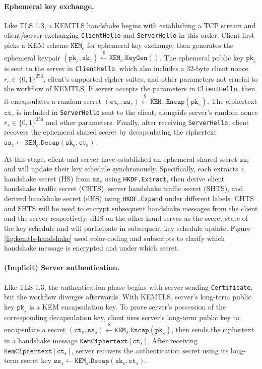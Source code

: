 \documentclass[letterpaper,12pt,titlepage,oneside,final]{book}
\newcommand{\kem}{\texttt{KEM}}
\newcommand{\pk}{\texttt{pk}}
\newcommand{\sk}{\texttt{sk}}
\newcommand{\leftsample}{\stackrel{\$}{\leftarrow}}
\begin{document}
\paragraph{Ephemeral key exchange.} Like TLS 1.3, a KEMTLS handshake begins with establishing a TCP stream and client/server exchanging \texttt{ClientHello} and \texttt{ServerHello} in this order. Client first picks a KEM scheme $\kem_e$ for ephemeral key exchange, then generates the ephemeral keypair $(\pk_e, \sk_e)\leftsample\kem_e\texttt{.KeyGen}()$.
The ephemeral public key $\pk_e$ is sent to the server in \texttt{ClientHello}, which also includes a 32-byte client nonce $r_c\in\{0,1\}^{256}$, client's supported cipher suites, and other parameters not crucial to the workflow of KEMTLS.
If server accepts the parameters in \texttt{ClientHello}, then it encapsulates a random secret $(\texttt{ct}_e, \texttt{ss}_e)\leftsample\kem_e\texttt{.Encap}(\pk_e)$.
The ciphertext $\texttt{ct}_e$ is included in \texttt{ServerHello} sent to the client, alongside server's random nonce $r_s\in\{0,1\}^{256}$ and other parameters.
Finally, after receiving \texttt{ServerHello}, client recovers the ephemeral shared secret by decapsulating the ciphertext $\texttt{ss}_e\leftarrow\kem_e\texttt{.Decap}(\sk_e, \texttt{ct}_e)$.

At this stage, client and server have established an ephemeral shared secret $\texttt{ss}_e$ and will update their key schedule synchronously.
Specifically, each extracts a handshake secret (HS) from $\texttt{ss}_e$ using \texttt{HKDF.Extract}, then derive client handshake traffic secret ({\color{blue}CHTS}), server handshake traffic secret ({\color{blue}SHTS}), and derived handshake secret (dHS) using \texttt{HKDF.Expand} under different labels.
CHTS and SHTS will be used to encrypt subsequent handshake messages from the client and the server respectively.
dHS on the other hand serves as  the secret state of the key schedule and will participate in subsequent key schedule update.
Figure \ref{fig:kemtls-handshake} used color-coding and subscripts to clarify which handshake message is encrypted and under which secret.

\paragraph{(Implicit) Server authentication.} Like TLS 1.3, the authentication phase begins with server sending \texttt{Certificate}, but the workflow diverges afterwards.
With KEMTLS, server's long-term public key $\pk_s$ is a KEM encapsulation key.
To prove server's possession of the corresponding decapsulation key, client uses server's long-term public key to encapsulate a secret $(\texttt{ct}_s, \texttt{ss}_s)\leftsample\kem_s\texttt{.Encap}(\pk_s)$, then sends the ciphertext in a handshake message $\texttt{KemCiphertext}[\texttt{ct}_s]$.
After receiving $\texttt{KemCiphertext}[\texttt{ct}_s]$, server recovers the authentication secret using its long-term secret key $\texttt{ss}_s\leftarrow\kem_s\texttt{.Decap}(\sk_s, \texttt{ct}_s)$.
\end{document}
